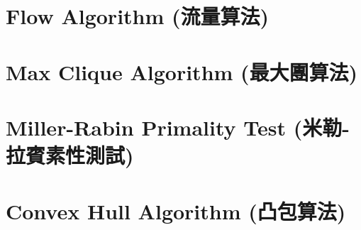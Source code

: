 \documentclass{article}
\begin{document}
\begin{multicols}{2}
\section{Flow Algorithm (流量算法)}



\section{Max Clique Algorithm (最大團算法)}



\section{Miller-Rabin Primality Test (米勒-拉賓素性測試)}



\section{Convex Hull Algorithm (凸包算法)}



\end{multicols}
\end{document}
